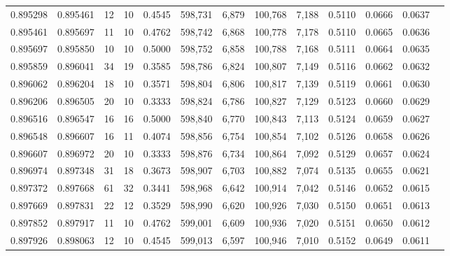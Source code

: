 \begin{tabular}{rrrrrrrrrrrrr}
0.895298 & 0.895461 &    12 &  10 &                                     0.4545 & 598,731 &   6,879 & 100,768 &   7,188 & 0.5110 & 0.0666 & 0.0637 \\
0.895461 & 0.895697 &    11 &  10 &                                     0.4762 & 598,742 &   6,868 & 100,778 &   7,178 & 0.5110 & 0.0665 & 0.0636 \\
0.895697 & 0.895850 &    10 &  10 &                                     0.5000 & 598,752 &   6,858 & 100,788 &   7,168 & 0.5111 & 0.0664 & 0.0635 \\
0.895859 & 0.896041 &    34 &  19 &                                     0.3585 & 598,786 &   6,824 & 100,807 &   7,149 & 0.5116 & 0.0662 & 0.0632 \\
0.896062 & 0.896204 &    18 &  10 &                                     0.3571 & 598,804 &   6,806 & 100,817 &   7,139 & 0.5119 & 0.0661 & 0.0630 \\
0.896206 & 0.896505 &    20 &  10 &                                     0.3333 & 598,824 &   6,786 & 100,827 &   7,129 & 0.5123 & 0.0660 & 0.0629 \\
0.896516 & 0.896547 &    16 &  16 &                                     0.5000 & 598,840 &   6,770 & 100,843 &   7,113 & 0.5124 & 0.0659 & 0.0627 \\
0.896548 & 0.896607 &    16 &  11 &                                     0.4074 & 598,856 &   6,754 & 100,854 &   7,102 & 0.5126 & 0.0658 & 0.0626 \\
0.896607 & 0.896972 &    20 &  10 &                                     0.3333 & 598,876 &   6,734 & 100,864 &   7,092 & 0.5129 & 0.0657 & 0.0624 \\
0.896974 & 0.897348 &    31 &  18 &                                     0.3673 & 598,907 &   6,703 & 100,882 &   7,074 & 0.5135 & 0.0655 & 0.0621 \\
0.897372 & 0.897668 &    61 &  32 &                                     0.3441 & 598,968 &   6,642 & 100,914 &   7,042 & 0.5146 & 0.0652 & 0.0615 \\
0.897669 & 0.897831 &    22 &  12 &                                     0.3529 & 598,990 &   6,620 & 100,926 &   7,030 & 0.5150 & 0.0651 & 0.0613 \\
0.897852 & 0.897917 &    11 &  10 &                                     0.4762 & 599,001 &   6,609 & 100,936 &   7,020 & 0.5151 & 0.0650 & 0.0612 \\
0.897926 & 0.898063 &    12 &  10 &                                     0.4545 & 599,013 &   6,597 & 100,946 &   7,010 & 0.5152 & 0.0649 & 0.0611 \\

\end{tabular}
